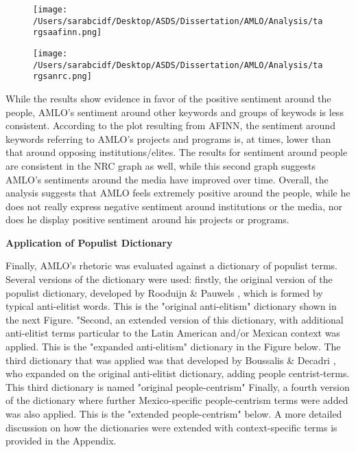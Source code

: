 \documentclass[]{article}
\begin{document}
\begin{figure}[H]
	\centering
	\caption{\label{}}
	\texttt{[image: /Users/sarabcidf/Desktop/ASDS/Dissertation/AMLO/Analysis/targsaafinn.png]}
\end{figure}

\begin{figure}[H]
	\centering
	\caption{\label{}}
	\texttt{[image: /Users/sarabcidf/Desktop/ASDS/Dissertation/AMLO/Analysis/targsanrc.png]}
\end{figure}

While the results show evidence in favor of the positive sentiment around the people, AMLO's sentiment around other keywords and groups of keywods is less consistent. According to the plot resulting from AFINN, the sentiment around keywords referring to AMLO's projects and programs is, at times, lower than that around opposing institutions/elites. The results for sentiment around people are consistent in the NRC graph as well, while this second graph suggests AMLO's sentiments around the media have improved over time. Overall, the analysis suggests that AMLO feels extremely positive around the people, while he does not really express negative sentiment around institutions or the media, nor does he display positive sentiment around his projects or programs.

\vspace{.5cm}
\noindent\textbf{Application of Populist Dictionary}
\vspace{.5cm}

\noindent Finally, AMLO's rhetoric was evaluated against a dictionary of populist terms. Several versions of the dictionary were used: firstly, the original version of the populist dictionary, developed by Rooduijn \& Pauwels \cite{rooduijn_measuring_2011}, which is formed by typical anti-elitist words. This is the "original anti-elitism" dictionary shown in the next Figure. "Second, an extended version of this dictionary, with additional anti-elitist terms particular to the Latin American and/or Mexican context was applied. This is the "expanded anti-elitism" dictionary in the Figure below. The third dictionary that was applied was that developed by Boussalis \& Decadri \cite{decadri_populism_2020}, who expanded on the original anti-elitist dictionary, adding people centrist-terms. This third dictionary is named "original people-centrism" Finally, a fourth version of the dictionary where further Mexico-specific people-centrism terms were added was also applied. This is the "extended people-centrism" below. A more detailed discussion on how the dictionaries were extended with context-specific terms is provided in the Appendix. 
\end{document}
